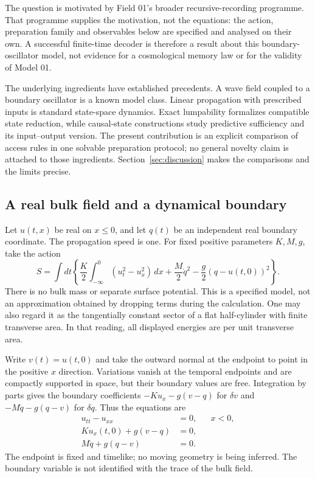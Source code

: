 \documentclass[11pt,a4paper]{article}
\theoremstyle{remark}
\begin{document}
The question is motivated by Field 01's broader recursive-recording
programme. That programme supplies the motivation, not the equations:
the action, preparation family and observables below are specified and
analysed on their own. A successful finite-time decoder is therefore a
result about this boundary-oscillator model, not evidence for a
cosmological memory law or for the validity of Model 01.

The underlying ingredients have established precedents. A wave field
coupled to a boundary oscillator is a known model class\cite{george}.
Linear propagation with prescribed inputs is standard state-space
dynamics\cite{frazzoli}. Exact lumpability formalizes compatible state
reduction\cite{horstmeyer}, while causal-state constructions study
predictive sufficiency and its input--output version\cite{shalizi,barnett}.
The present contribution is an explicit comparison of access rules in
one solvable preparation protocol; no general novelty claim is attached
to those ingredients. Section~\ref{sec:discussion} makes the comparisons
and the limits precise.

\subsection{A real bulk field and a dynamical boundary}

Let $u(t,x)$ be real on $x\le0$, and let $q(t)$ be an independent real
boundary coordinate. The propagation speed is one. For fixed positive
parameters $K,M,g$, take the action
\begin{equation}
 S=\int dt\left\{
 \frac K2\int_{-\infty}^0(u_t^2-u_x^2)\,dx
 +\frac M2\dot q^2-\frac g2(q-u(t,0))^2\right\}.
 \label{eq:action}
\end{equation}
There is no bulk mass or separate surface potential. This is a specified
model, not an approximation obtained by dropping terms during the
calculation. One may also regard it as the tangentially constant sector
of a flat half-cylinder with finite transverse area. In that reading,
all displayed energies are per unit transverse area.

Write $v(t)=u(t,0)$ and take the outward normal at the endpoint to point
in the positive $x$ direction. Variations vanish at the temporal endpoints
and are compactly supported in space, but their boundary values are free.
Integration by parts gives the boundary coefficients
$-K u_x-g(v-q)$ for $\delta v$ and $-M\ddot q-g(q-v)$ for $\delta q$.
Thus the equations are
\begin{align}
 u_{tt}-u_{xx}&=0, &&x<0,\\
 K u_x(t,0)+g(v-q)&=0,\\
 M\ddot q+g(q-v)&=0.
 \label{eq:system}
\end{align}
The endpoint is fixed and timelike; no moving geometry is being inferred.
The boundary variable is not identified with the trace of the bulk field.
\end{document}
